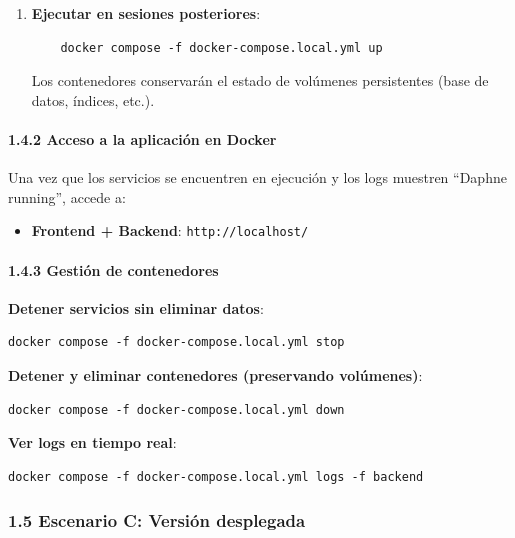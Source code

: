\begin{enumerate}
    Nota: en Docker no hace falta lanzar un comando extra para generar predicciones si la BD está vacía; el backend las genera automáticamente en el arranque inicial mediante \texttt{docker-entrypoint.sh}.
    
    \item \textbf{Ejecutar en sesiones posteriores}:
    \begin{verbatim}
    docker compose -f docker-compose.local.yml up
    \end{verbatim}
    
    Los contenedores conservarán el estado de volúmenes persistentes (base de datos, índices, etc.).
    
\end{enumerate}

\paragraph*{1.4.2 Acceso a la aplicación en Docker}

Una vez que los servicios se encuentren en ejecución y los logs muestren ``Daphne running'', accede a:

\begin{itemize}
    \item \textbf{Frontend + Backend}: \texttt{http://localhost/}
\end{itemize}


\paragraph*{1.4.3 Gestión de contenedores}

\textbf{Detener servicios sin eliminar datos}:
\begin{verbatim}
docker compose -f docker-compose.local.yml stop
\end{verbatim}

\textbf{Detener y eliminar contenedores (preservando volúmenes)}:
\begin{verbatim}
docker compose -f docker-compose.local.yml down
\end{verbatim}

\textbf{Ver logs en tiempo real}:
\begin{verbatim}
docker compose -f docker-compose.local.yml logs -f backend
\end{verbatim}

\subsubsection*{1.5 Escenario C: Versión desplegada}

